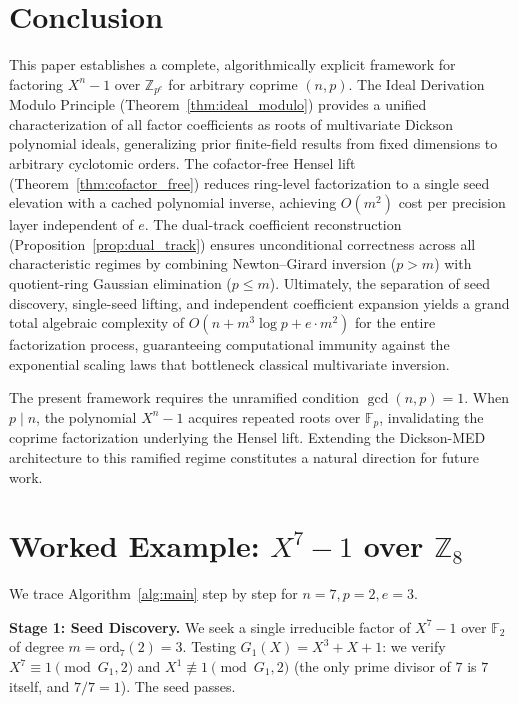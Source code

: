\documentclass[12pt]{article}
\theoremstyle{plain}
\begin{document}
\section{Conclusion}

This paper establishes a complete, algorithmically explicit framework for factoring $X^n-1$ over $\mathbb{Z}_{p^e}$ for arbitrary coprime $(n, p)$. The Ideal Derivation Modulo Principle (Theorem~\ref{thm:ideal_modulo}) provides a unified characterization of all factor coefficients as roots of multivariate Dickson polynomial ideals, generalizing prior finite-field results \cite{Fitzgerald2007, Wang2012} from fixed dimensions to arbitrary cyclotomic orders. The cofactor-free Hensel lift (Theorem~\ref{thm:cofactor_free}) reduces ring-level factorization to a single seed elevation with a cached polynomial inverse, achieving $O(m^2)$ cost per precision layer independent of $e$. The dual-track coefficient reconstruction (Proposition~\ref{prop:dual_track}) ensures unconditional correctness across all characteristic regimes by combining Newton--Girard inversion ($p > m$) with quotient-ring Gaussian elimination ($p \leq m$). Ultimately, the separation of seed discovery, single-seed lifting, and independent coefficient expansion yields a grand total algebraic complexity of $O(n + m^3 \log p + e \cdot m^2)$ for the entire factorization process, guaranteeing computational immunity against the exponential scaling laws that bottleneck classical multivariate inversion.

The present framework requires the unramified condition $\gcd(n, p) = 1$. When $p \mid n$, the polynomial $X^n-1$ acquires repeated roots over $\mathbb{F}_p$, invalidating the coprime factorization underlying the Hensel lift. Extending the Dickson-MED architecture to this ramified regime constitutes a natural direction for future work.

\appendix
\section{Worked Example: $X^7-1$ over $\mathbb{Z}_8$}
\label{app:worked_example}

We trace Algorithm~\ref{alg:main} step by step for $n=7, p=2, e=3$.

\textbf{Stage 1: Seed Discovery.}
We seek a single irreducible factor of $X^7-1$ over $\mathbb{F}_2$ of degree $m = \text{ord}_7(2) = 3$. Testing $G_1(X) = X^3 + X + 1$: we verify $X^7 \equiv 1 \pmod{G_1, 2}$ and $X^1 \not\equiv 1 \pmod{G_1, 2}$ (the only prime divisor of $7$ is $7$ itself, and $7/7=1$). The seed passes.
\end{document}

